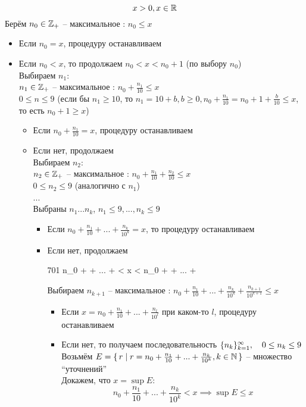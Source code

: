 \begin{algorithm}
	$$ x > 0, x \in \mathbb{R} $$
	Берём $n_0 \in \mathbb{Z}_+ $ -- максимальное : $n_0 \le x$
	\begin{itemize}
		\item Если $n_0 = x$, процедуру останавливаем
		\item Если $n_0 < x$, то продолжаем
		$n_0 < x < n_0 + 1 $ (по выбору $n_0$) \\
		Выбираем $n_1$: \\
		$n_1 \in \mathbb{Z}_+$ -- максимальное : $n_0 + \frac{n_1}{10} \le x$ \\
		$0 \le n \le 9 $ (если бы $n_1 \ge 10$, то $n_1 = 10 + b, b \ge 0, n_0 + \frac{n_1}{10} = n_0 + 1 + \frac{b}{10} \le x$, то есть $n_0 + 1 \ge x$)
		\begin{itemize}
			\item Если $n_0 + \frac{n_1}{10} = x$, процедуру останавливаем
			\item Если нет, продолжаем \\
			Выбираем $n_2$: \\
			$n_2 \in \mathbb{Z}_+$ -- максимальное : $n_0 + \frac{n_1}{10} + \frac{n_2}{10} \le x$ \\
			$0 \le n_2 \le 9$ (аналогично с $n_1$) \\
			... \\
			Выбраны $n_1...n_k$, $n_1 \le 9, ..., n_k \le 9$
			\begin{itemize}
				\item Если $n_0 + \frac{n_1}{10} + ... + \frac{n_k}{10^k} = x$, то процедуру останавливаем
				\item Если нет, продолжаем
				\begin{equ}{701}
					n_0 +  + ... +  < x < n_0 +  + ... + 
				\end{equ}
				Выбираем $n_{k+1}$ -- максимальное : $n_0 + \frac{n_1}{10} + ... + \frac{n_k}{10^k} + \frac{n_{k+1}}{10^{k+1}} \le x $
				\begin{itemize}
					\item Если $x = n_0 + \frac{n_1}{10} + ... + \frac{n_l}{10^l}$ при каком-то $l$, процедуру останавливаем
					\item Если нет, то получаем последовательность $\{n_k\}_{k=1}^{\infty}, \quad 0 \le n_k \le 9 $ \\
					Возьмём $E = \set{r | r = n_0 + \frac{n_1}{10} + ... + \frac{n_k}{10^k}, k \in \ensuremath{\mathbb{N}}} $ -- множество ``уточнений'' \\
					Докажем, что $x = \sup E$:
					$$ n_0 + \frac{n_1}{10} + ... + \frac{n_k}{10^k} < x \implies \sup E \le x $$

\end{itemize}
\end{itemize}
\end{itemize}
\end{itemize}
\end{algorithm}

